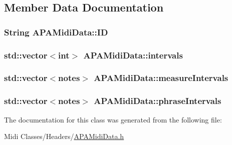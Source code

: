 \subsection{Member Data Documentation}
\hypertarget{class_a_p_a_midi_data_ae8027131ba55c8755f452ddff07fb614}{
\subsubsection[{I\+D}]{\setlength{\rightskip}{0pt plus 5cm}String A\+P\+A\+Midi\+Data\+::\+I\+D}}\label{class_a_p_a_midi_data_ae8027131ba55c8755f452ddff07fb614}
\hypertarget{class_a_p_a_midi_data_a449871212e64922701a7ae9191e3a013}{
\subsubsection[{intervals}]{\setlength{\rightskip}{0pt plus 5cm}std\+::vector$<$int$>$ A\+P\+A\+Midi\+Data\+::intervals}}\label{class_a_p_a_midi_data_a449871212e64922701a7ae9191e3a013}
\hypertarget{class_a_p_a_midi_data_a8b8b037cc91565601098df0a432c7619}{
\subsubsection[{measure\+Intervals}]{\setlength{\rightskip}{0pt plus 5cm}std\+::vector$<${\bf notes}$>$ A\+P\+A\+Midi\+Data\+::measure\+Intervals}}\label{class_a_p_a_midi_data_a8b8b037cc91565601098df0a432c7619}
\hypertarget{class_a_p_a_midi_data_a281995e0adb7efdd2df91deb7c327d57}{
\subsubsection[{phrase\+Intervals}]{\setlength{\rightskip}{0pt plus 5cm}std\+::vector$<${\bf notes}$>$ A\+P\+A\+Midi\+Data\+::phrase\+Intervals}}\label{class_a_p_a_midi_data_a281995e0adb7efdd2df91deb7c327d57}


The documentation for this class was generated from the following file\+:\begin{DoxyCompactItemize}
\item 
Midi Classes/\+Headers/\hyperlink{_a_p_a_midi_data_8h}{A\+P\+A\+Midi\+Data.\+h}\end{DoxyCompactItemize}
